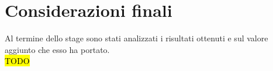 \section{Considerazioni finali}
	Al termine dello stage sono stati analizzati i risultati ottenuti e sul valore aggiunto che esso ha portato.\\
	\hl{TODO }	

























